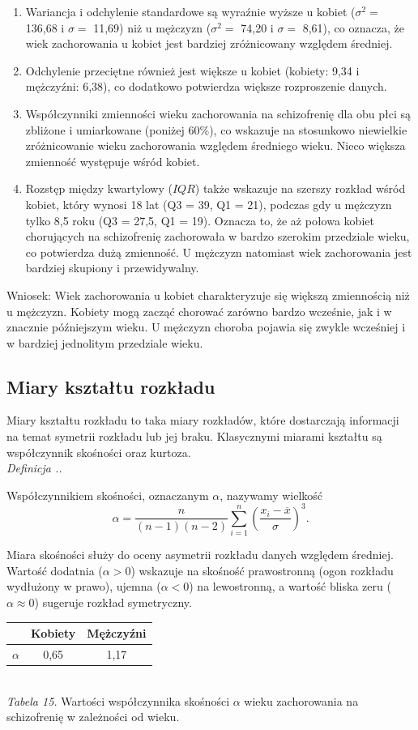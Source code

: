 \documentclass{mwart}
\newenvironment{defi}[1][]{
	\refstepcounter{definition}%
	\noindent\textit{Definicja \thesection.\thedefinition. #1}\par\nopagebreak\vspace{0.5em}\normalfont
}{\par\vspace{1em}}
\begin{document}
	\begin{enumerate}
		\item Wariancja i odchylenie standardowe są wyraźnie wyższe u kobiet ($\sigma^2=$ 136,68 i $\sigma =$ 11,69) niż u mężczyzn ($\sigma^2=$ 74,20 i $\sigma=$ 8,61), co oznacza, że wiek zachorowania u kobiet jest bardziej zróżnicowany względem średniej.
		\item Odchylenie przeciętne również jest większe u kobiet (kobiety: 9,34 i mężczyźni: 6,38), co dodatkowo potwierdza większe rozproszenie danych.
		\item Współczynniki zmienności wieku zachorowania na schizofrenię dla obu płci są zbliżone i umiarkowane (poniżej 60$\%$), co wskazuje na stosunkowo niewielkie zróżnicowanie wieku zachorowania względem średniego wieku. Nieco większa zmienność występuje wśród kobiet.
		\item Rozstęp między kwartylowy ($IQR$) także wskazuje na szerszy rozkład wśród kobiet, który wynosi 18 lat (Q3 = 39, Q1 = 21), podczas gdy u mężczyzn tylko 8,5 roku (Q3 = 27,5, Q1 = 19). Oznacza to, że aż połowa kobiet chorujących na schizofrenię zachorowała w bardzo szerokim przedziale wieku, co potwierdza dużą zmienność. U mężczyzn natomiast wiek zachorowania jest bardziej skupiony i przewidywalny.
	\end{enumerate}
	Wniosek: Wiek zachorowania u kobiet charakteryzuje się większą zmiennością niż u mężczyzn. Kobiety mogą zacząć chorować zarówno bardzo wcześnie, jak i w znacznie późniejszym wieku. U mężczyzn choroba pojawia się zwykle wcześniej i w bardziej jednolitym przedziale wieku.
	
	\subsection{Miary kształtu rozkładu}
	\noindent
	Miary kształtu rozkładu to taka miary rozkładów, które dostarczają informacji na temat symetrii rozkładu lub jej braku. Klasycznymi miarami kształtu są współczynnik skośności oraz kurtoza.\\
	\begin{defi}
		Współczynnikiem skośności, oznaczanym $\alpha$, nazywamy wielkość 
		$$\alpha=\frac{n}{(n-1)(n-2)}\sum_{i=1}^n\left( \frac{x_i-\overline{x}}{\sigma}\right)^3 .$$
	\end{defi}
	\noindent
	Miara skośności służy do oceny asymetrii rozkładu danych względem średniej. Wartość dodatnia ($\alpha>0$) wskazuje na skośność prawostronną (ogon rozkładu wydłużony w prawo), ujemna ($\alpha<0$) na lewostronną, a wartość bliska zeru ($\alpha\approx0$) sugeruje rozkład symetryczny.
	\begin{center}
		\begin{tabular}{|c|c|c|}
			\hline
			&Kobiety&Mężczyźni\\
			\hline
			$\alpha$&0,65&1,17\\
			\hline
		\end{tabular}\\
		\textit{Tabela 15.} Wartości współczynnika skośności $\alpha$ wieku zachorowania na schizofrenię w zależności od wieku.
	\end{center}
	
\end{document}
